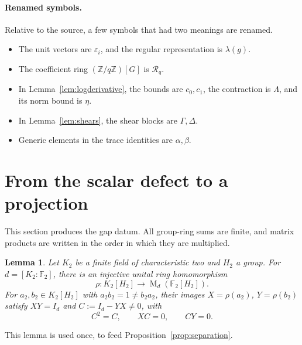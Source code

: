 \documentclass[11pt]{article}
\newtheorem{lemma}[theorem]{Lemma}
\theoremstyle{remark}
\numberwithin{equation}{section}
\newcommand{\F}{\mathbb F}
\newcommand{\Z}{\mathbb Z}
\newcommand{\Mat}{\operatorname{M}}
\begin{document}
\paragraph{Renamed symbols.}
Relative to the source, a few symbols that had two meanings are renamed.
\begin{itemize}[leftmargin=2em]
\item The unit vectors are $\varepsilon_i$, and the regular representation is $\lambda(g)$.
\item The coefficient ring $(\Z/q\Z)[G]$ is $\mathcal R_q$.
\item In Lemma~\ref{lem:logderivative}, the bounds are $c_0,c_1$, the contraction is $\Lambda$, and its norm bound is $\eta$.
\item In Lemma~\ref{lem:shears}, the shear blocks are $\Gamma,\Delta$.
\item Generic elements in the trace identities are $\alpha,\beta$.
\end{itemize}

\section{From the scalar defect to a projection}
\label{sec:projection}

This section produces the gap datum. All group-ring sums are finite, and matrix products are written in the order in which they are multiplied.

\begin{lemma}\label{lem:binary}
Let $K_2$ be a finite field of characteristic two and $H_2$ a group.
For $d=[K_2:\F_2]$, there is an injective unital ring homomorphism
\[
 \rho:K_2[H_2]\longrightarrow\Mat_d(\F_2[H_2]).
\]
For $a_2,b_2\in K_2[H_2]$ with $a_2b_2=1\ne b_2a_2$, their images $X=\rho(a_2)$, $Y=\rho(b_2)$ satisfy
$XY=I_d$ and $C:=I_d-YX\ne0$, with
\begin{equation}\label{eq:defect}
 C^2=C,\qquad XC=0,\qquad CY=0.
\end{equation}
\end{lemma}

This lemma is used once, to feed Proposition~\ref{prop:separation}.
\end{document}
